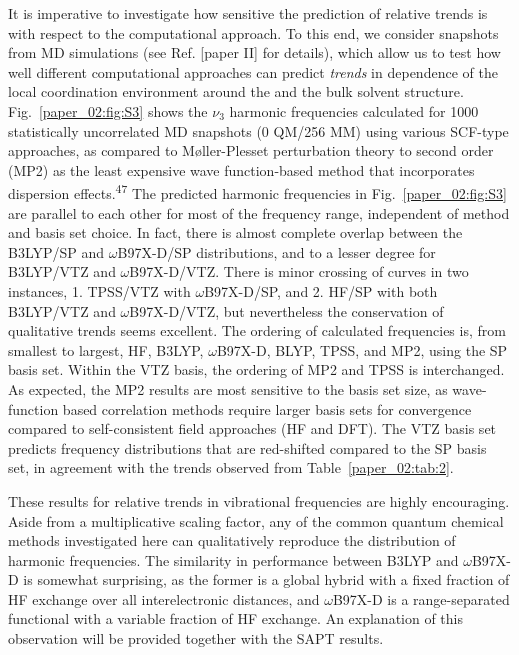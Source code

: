 It is imperative to investigate how sensitive the prediction of relative trends is with respect to the computational approach. To this end, we consider snapshots from MD simulations (see Ref. {[}paper II{]} for details), which allow us to test how well different computational approaches can predict \emph{trends} in dependence of the local coordination environment around the  and the bulk solvent structure. Fig.~\ref{paper_02:fig:S3} shows the  \(\nu_{3}\) harmonic frequencies calculated for \num{1000} statistically uncorrelated MD snapshots (0 QM/256 MM) using various SCF-type approaches, as compared to Møller-Plesset perturbation theory to second order (MP2) as the least expensive wave function-based method that incorporates dispersion effects.\textsuperscript{47} The predicted harmonic frequencies in Fig.~\ref{paper_02:fig:S3} are parallel to each other for most of the frequency range, independent of method and basis set choice. In fact, there is almost complete overlap between the B3LYP/SP and \(\omega\)B97X-D/SP distributions, and to a lesser degree for B3LYP/VTZ and \(\omega\)B97X-D/VTZ. There is minor crossing of curves in two instances, 1. TPSS/VTZ with \(\omega\)B97X-D/SP, and 2. HF/SP with both B3LYP/VTZ and \(\omega\)B97X-D/VTZ, but nevertheless the conservation of qualitative trends seems excellent. The ordering of calculated frequencies is, from smallest to largest, HF, B3LYP, \(\omega\)B97X-D, BLYP, TPSS, and MP2, using the SP basis set. Within the VTZ basis, the ordering of MP2 and TPSS is interchanged. As expected, the MP2 results are most sensitive to the basis set size, as wave-function based correlation methods require larger basis sets for convergence compared to self-consistent field approaches (HF and DFT). The VTZ basis set predicts frequency distributions that are red-shifted compared to the SP basis set, in agreement with the trends observed from Table~\ref{paper_02:tab:2}.

These results for relative trends in vibrational frequencies are highly encouraging. Aside from a multiplicative scaling factor, any of the common quantum chemical methods investigated here can qualitatively reproduce the distribution of harmonic frequencies. The similarity in performance between B3LYP and \(\omega\)B97X-D is somewhat surprising, as the former is a global hybrid with a fixed fraction of HF exchange over all interelectronic distances, and \(\omega\)B97X-D is a range-separated functional with a variable fraction of HF exchange. An explanation of this observation will be provided together with the SAPT results.

